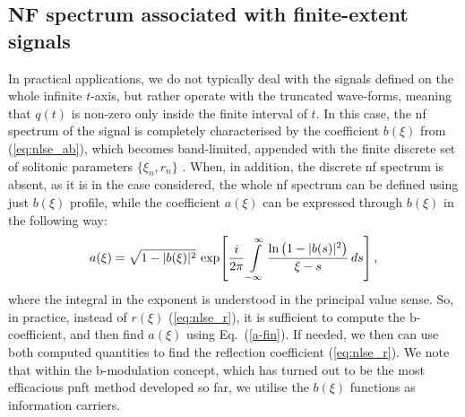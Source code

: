 \subsection{NF spectrum associated with finite-extent signals}
In practical applications, we do not typically deal with the signals defined on the whole infinite $t$-axis, but rather operate with the truncated wave-forms, meaning that $q(t)$ is non-zero only inside the finite interval of $t$. In this case, the \acrshort{nf} spectrum of the signal is completely characterised by the coefficient $b(\xi)$ from (\ref{eq:nlse_ab}), which becomes band-limited, appended with the finite discrete set of solitonic parameters $\{\xi_n,r_n\}$ \cite{gzl18,svp20}. When, in addition, the discrete \acrshort{nf} spectrum is absent, as it is in the case considered, the whole \acrshort{nf} spectrum can be defined using just $b(\xi)$ profile\cite{w17}, while the coefficient $a(\xi)$ can be expressed through $b(\xi)$ in the following way:
\begin{equation}\label{a-fin}
a(\xi) = \sqrt{1-|b(\xi)|^2} \, \exp \! \left[ \frac{i}{2 \pi} \intop^{\infty}_{-\infty} \frac{\ln \big(1-|b(s)|^2 \big)}{\xi - s} \, ds \right],
\end{equation}
where the integral in the exponent is understood in the principal value sense.
So, in practice, instead of $r(\xi)$ (\ref{eq:nlse_r}), it is sufficient to compute the b-coefficient, and then find $a(\xi)$ using Eq.~(\ref{a-fin}). If needed, we then can use both computed quantities to find the reflection coefficient (\ref{eq:nlse_r}). We note that within the b-modulation concept, which has turned out to be the most efficacious \acrshort{pnft} method developed so far, we utilise the $b(\xi)$ functions as information carriers\cite{w17,gzl18,svp20,cw20}.




